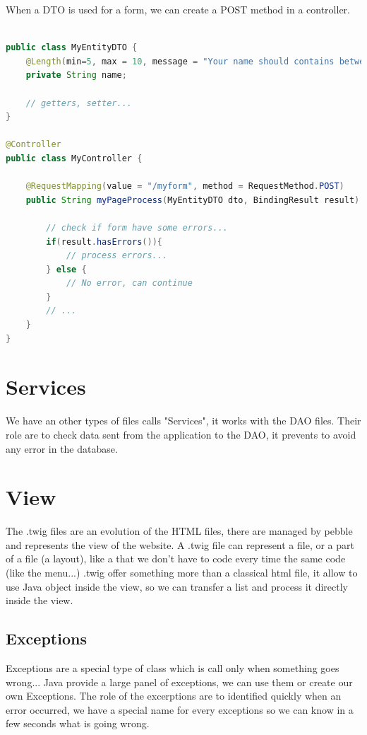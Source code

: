 When a DTO is used for a form, we can create a POST method in a controller. 


\begin{lstlisting}[language=java,caption={JAVA}]

public class MyEntityDTO {
	@Length(min=5, max = 10, message = "Your name should contains between 5 and 10 characters.")
	private String name;
	
	// getters, setter...
}

@Controller
public class MyController {

	@RequestMapping(value = "/myform", method = RequestMethod.POST)
	public String myPageProcess(MyEntityDTO dto, BindingResult result) {
		
		// check if form have some errors...
		if(result.hasErrors()){
			// process errors... 
		} else {
			// No error, can continue
		}		
		// ...
	}
}
\end{lstlisting}




\section{Services}

We have an other types of files calls "Services", it works with the DAO files.
Their role are to check data sent from the application to the DAO, it prevents to avoid any error in the database.


\section{View}

The .twig files are an evolution of the HTML files, there are managed by pebble and represents the view of the website.
A .twig file can represent a file, or a part of a file (a layout), like a that we don't have to code every time the same code (like the menu...)
.twig offer something more than a classical html file, it allow to use Java object inside the view, so we can transfer a list and process it directly inside the view.



\subsection{Exceptions}

Exceptions are a special type of class which is call only when something goes wrong...
Java provide a large panel of exceptions, we can use them or create our own Exceptions.
The role of the excerptions are to identified quickly when an error occurred, we have a special name for every exceptions so we can know in a few seconds what is going wrong.


